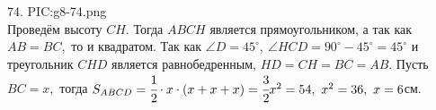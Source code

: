 74. {{PIC:g8-74.png}}\\
Проведём высоту $CH.$ Тогда $ABCH$ является прямоугольником, а так как $AB=BC,$ то и квадратом. Так как $\angle D=45^\circ,\ \angle HCD=90^\circ-45^\circ=45^\circ$ и треугольник $CHD$ является равнобедренным, $HD=CH=BC=AB.$ Пусть $BC=x,$ тогда $S_{ABCD}=\cfrac{1}{2}\cdot{x}\cdot(x+x+x)=\cfrac{3}{2}x^2=54,\ x^2=36,\ x=6$см.\newpage\noindent
